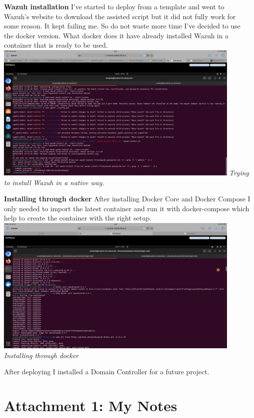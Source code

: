 \documentclass[12pt, letterpaper]{article}
\begin{document}
\textbf{Wazuh installation}
I've started to deploy from a template and went to Wazuh's website to download the assisted script but it did not fully work for some reason. It kept failing me. So do not waste more time I've decided to use the docker version. What docker does it have already installed Wazuh in a container that is ready to be used. 
\hfill\break
\includegraphics[width=0.9\textwidth]{fotos/Week 4/Trying to install wazuh native.png}
\break
\emph{Trying to install Wazuh in a native way.}

\hfill\break
\hfill\break
\textbf{Installing through docker}
\hfill\break
After installing Docker Core and Docker Compose I only needed to import the latest container and run it with docker-compose which help to create the container with the right setup.
\hfill\break
\includegraphics[width=0.9\textwidth]{fotos/Week 4/Wazuh docker install.png}
\break
\emph{Installing through docker}

After deploying I installed a Domain Controller for a future project. 
\newpage
\section{Attachment 1: My Notes}
\end{document}
